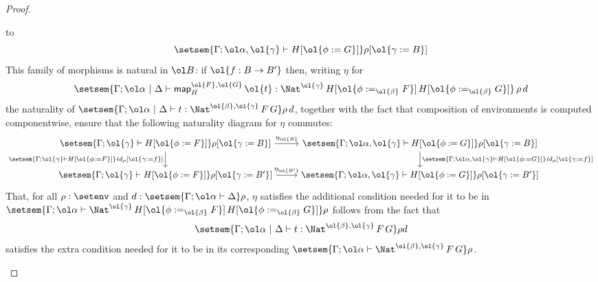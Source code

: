\documentclass[acmsmall,review,anonymous]{acmart}
\theoremstyle{definition}
\renewcommand{\id}{\mathit{id}}
\newcommand{\map}{\mathsf{map}}
\begin{document}
\begin{proof}
\begin{itemize}
to 
\[\setsem{\Gamma ;\ol\alpha, \ol{\gamma} \vdash H[\ol{\phi := G}]}\rho[\ol{\gamma := B}]\]
This family of morphisms is natural in $\ol B$: if $\ol{f : B \to B'}$
then, writing $\eta$ for
\[
\setsem{\Gamma; \ol\alpha~|~\Delta \vdash
\map^{\ol{F},\ol{G}}_H\, \ol{t} :
\Nat^{\ol{\gamma}}\,H[\ol{\phi :=_{\ol{\beta}} F}]\,H[\ol{\phi
    :=_{\ol{\beta}} G}]}\,\rho\,d
\]
the naturality of
$\setsem{\Gamma; \ol\alpha~|~\Delta \vdash t : \Nat^{\ol{\beta},\ol{\gamma}}\,F\,G} \rho\, d$,
together with the fact that composition of environments is
computed componentwise, ensure that the following naturality diagram
for $\eta$ commutes:
{\footnotesize
\[\begin{tikzcd}
\setsem{\Gamma ;\ol{\gamma} \vdash H[\ol{\phi := F}]}\rho[\ol{\gamma
      := B}] \ar[r,
  "{\;\;\;\eta_{\ol{B}}\;\;\; }"]
\ar[d, "{\setsem{\Gamma ;\ol{\gamma} \vdash H[\ol{\phi :=
          F}]}\id_{\rho}[\ol{\gamma := f}]}"']
& \setsem{\Gamma ; \ol\alpha, \ol{\gamma} \vdash H[\ol{\phi := G}]}\rho[\ol{\gamma
      := B}]
\ar[d, "{\setsem{\Gamma ; \ol\alpha, \ol{\gamma} \vdash H[\ol{\phi :=
          G}]}\id_{\rho}[\ol{\gamma := f}]}"]\\
\setsem{\Gamma ;\ol{\gamma} \vdash H[\ol{\phi := F}]}\rho[\ol{\gamma
      := B'}] \ar[r,
  "{\eta_{\ol{B'}}}"]
& \setsem{\Gamma ; \ol\alpha, \ol{\gamma} \vdash H[\ol{\phi := G}]}\rho[\ol{\gamma
      := B'}] 
\end{tikzcd}\]}
That, for all $\rho : \setenv$ and $d : \setsem{\Gamma;\ol\alpha \vdash
  \Delta}\rho$, $\eta$ satisfies the additional condition needed for
it to be in $\setsem{\Gamma; \ol\alpha \vdash
  \Nat^{\ol{\gamma}}\,H[\ol{\phi :=_{\ol{\beta}} F}]\,H[\ol{\phi
      :=_{\ol{\beta}} G}]}\rho$ follows from the fact
that \[\setsem{\Gamma; \ol\alpha~|~\Delta \vdash t :
  \Nat^{\ol{\beta},\ol{\gamma}}\,F\,G} \rho d\] satisfies the extra
condition needed for it to be in its corresponding $\setsem{\Gamma;
  \ol\alpha \vdash \Nat^{\ol{\beta},\ol{\gamma}}\,F\,G}\rho$.


\end{itemize}
\end{proof}
\end{document}
